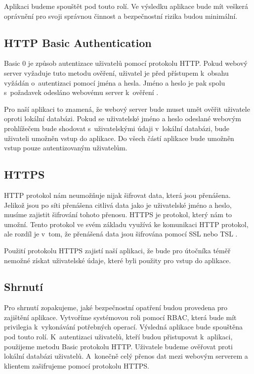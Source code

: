     Aplikaci budeme spouštět pod touto rolí. Ve výsledku aplikace bude mít veškerá oprávnění pro svoji správnou činnost a bezpečnostní rizika budou minimální.
    \subsection{HTTP Basic Authentication}
    \label{httpauth}
    Basic 0 je způsob autentizace uživatelů pomocí protokolu HTTP. Pokud webový server vyžaduje tuto metodu ověření, uživatel je před přístupem k~obsahu vyžádán o~autentizaci pomocí jména a hesla. Jméno a heslo je pak spolu s~požadavek odesláno webovému server k~ověření \cite{RFC2617}.

    Pro naší aplikaci to znamená, že webový server bude muset umět ověřit uživatele oproti lokální databázi. Pokud se uživatelské jméno a heslo odeslané webovým prohlížečem bude shodovat s~uživatelskými údaji v~lokální databázi, bude uživateli umožněn vstup do aplikace. Do všech částí aplikace bude umožněn vstup pouze autentizovaným uživatelům.

    \subsection{HTTPS}
    \label{https}
    HTTP protokol nám neumožňuje nijak šifrovat data, která jsou přenášena. Jelikož jsou po síti přenášena citlivá data jako je uživatelské jméno a heslo, musíme zajistit šifrování tohoto přenosu. HTTPS je protokol, který nám to umožní. Tento protokol ve svém základu využívá ke komunikaci HTTP protokol, ale rozdíl je v~tom, že přenášená data jsou šifrována pomocí SSL nebo TSL \cite{RFC2818}.

    Použití protokolu HTTPS zajistí naší aplikaci, že bude pro útočníka téměř nemožné získat uživatelské údaje, které byli použity pro vstup do aplikace.
    \subsection{Shrnutí}
    Pro shrnutí zopakujeme, jaké bezpečnostní opatření budou provedena pro zajištění aplikace. Vytvoříme systémovou roli pomocí RBAC, která bude mít privilegia k~vykonávání potřebných operací. Výsledná aplikace bude spouštěna pod touto rolí. K~autentizaci uživatelů, kteří budou přistupovat k~aplikaci, použijeme metodu Basic protokolu HTTP. Uživatele budeme ověřovat proti lokální databázi uživatelů. A~konečně celý přenos dat mezi webovým serverem a klientem zašifrujeme pomocí protokolu HTTPS.

